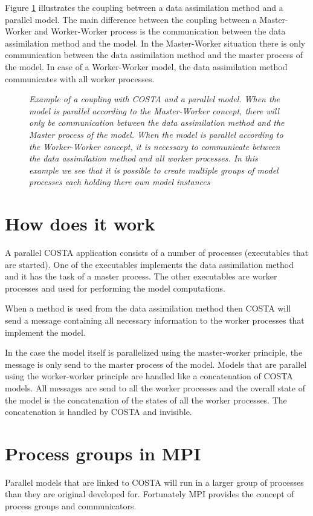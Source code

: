 Figure \ref{Fig:WW_processes} illustrates the coupling between a data
assimilation method and a parallel model. The main difference between the
coupling between a Master-Worker and Worker-Worker process is the
communication between the data assimilation method and the model. In the
Master-Worker situation there is only communication between the data
assimilation method and the master process of the model. In case of a
Worker-Worker model, the data assimilation method communicates with all
worker processes.

\begin{figure}
\caption{\em Example of a coupling with COSTA and a parallel model. When the
model is parallel according to the Master-Worker concept, there will only
be communication between the data assimilation method and the Master process
of the model. When the model is parallel according to the Worker-Worker
concept, it is necessary to communicate between the data assimilation
method and all worker processes. In this example we see that it is possible
to create multiple groups of model processes each holding there own model
instances}
\label{Fig:WW_processes}
\end{figure}


\section{How does it work}
A parallel COSTA application consists of a number of processes (executables
that are started). One of the executables implements the data assimilation
method and it has the task of a master process. The other executables are
worker processes and used for performing the model computations. 

When a method is used from the data assimilation method then COSTA
will send a message containing all necessary information to the worker
processes that implement the model. 

In the case the model itself is parallelized using the master-worker
principle, the message is only send to the master process of the model. 
Models that are parallel using the worker-worker principle are handled like
a concatenation of COSTA models. All messages are send to all the worker
processes and the overall state of the model is the concatenation of the
states of all the worker processes. The concatenation is handled by COSTA
and invisible.

\section{Process groups in MPI}
Parallel models that are linked to COSTA will run in a larger group of
processes than they are original developed for. Fortunately MPI
provides the concept of process groups and communicators.

